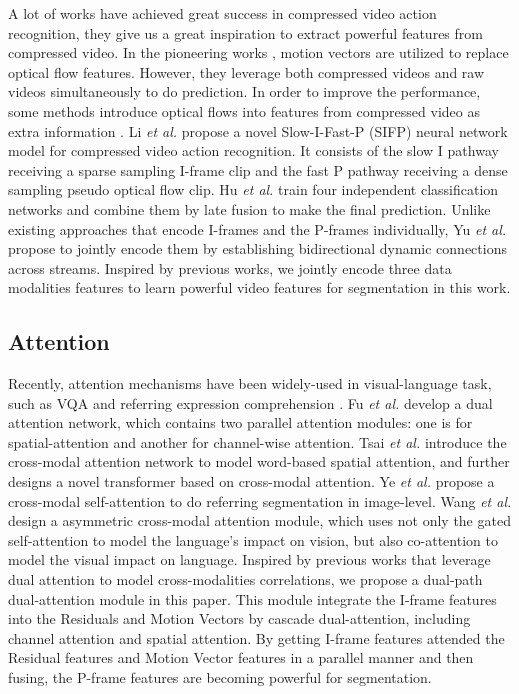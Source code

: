 \documentclass[sigconf]{acmart}
\begin{document}
A lot of works have achieved great success in compressed video action recognition, they give us a great inspiration to extract powerful features from compressed video. In the pioneering works \cite{zhang2016real, zhang2018real}, motion vectors are utilized to replace optical flow features. However, they leverage both compressed videos and raw videos simultaneously to do prediction. In order to improve the performance, some methods introduce optical flows into features from compressed video as extra information \cite{shou2019dmc, wu2018compressed}. 
Li \textit{et al.} \cite{li2020slow} propose a novel Slow-I-Fast-P (SIFP) neural network model for compressed video action recognition. It consists of the slow I pathway receiving a sparse sampling I-frame clip and the fast P pathway receiving a dense sampling pseudo optical flow clip.
Hu \textit{et al.} \cite{hu2020mv2flow} train four independent classification networks and combine them by late fusion to make the final prediction.
Unlike existing approaches that encode I-frames and the P-frames individually, Yu \textit{et al.} \cite{yu2020self} propose to jointly encode them by establishing bidirectional dynamic connections across streams.
Inspired by previous works, we jointly encode three data modalities features to learn powerful video features for segmentation in this work.

\subsection{Attention}

Recently, attention mechanisms \cite{zhuo2017deep, wang2018joint} have been widely-used in visual-language task, such as VQA \cite{xu2015show,2016stacked_attention,2016hierarchical_attention,2019inter_intra,2018BAN, lu2018co, han2020interpretable, han2021greedy} and referring expression comprehension \cite{ye2019cross, wang2018non}.
Fu \textit{et al.} \cite{fu2019dual} develop a dual attention network, which contains two parallel attention modules: one is for spatial-attention and another for channel-wise attention.
Tsai \textit{et al.} \cite{tsai2019multimodal} introduce the cross-modal attention network to model word-based spatial attention, and further designs a novel transformer based on cross-modal attention.
Ye \textit{et al.} \cite{ye2019cross} propose a cross-modal self-attention to do referring segmentation in image-level.
Wang \textit{et al.} \cite{wang2019asymmetric} design a asymmetric cross-modal attention module, which uses not only the gated self-attention to model the language's impact on vision, but also co-attention to model the visual impact on language. Inspired by previous works that leverage dual attention to model cross-modalities correlations, we propose a dual-path dual-attention module in this paper. This module integrate the I-frame features into the Residuals and Motion Vectors by cascade dual-attention, including channel attention and spatial attention. By getting I-frame features attended the Residual features and Motion Vector features in a parallel manner and then fusing, the P-frame features are becoming powerful for segmentation. 
\end{document}
